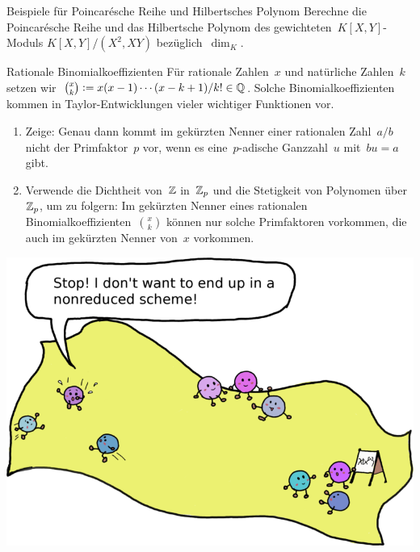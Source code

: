 \documentclass[entwurf]{uebblatt}
\begin{document}

\begin{aufgabe}{3}{Beispiele für Poincarésche Reihe und Hilbertsches Polynom}
Berechne die Poincarésche Reihe und das Hilbertsche Polynom des
gewichteten~$K[X,Y]$-Moduls $K[X,Y]/(X^2, XY)$ bezüglich~$\dim_K$.
\end{aufgabe}

\vfill

\begin{aufgabe}{0}{Rationale Binomialkoeffizienten}
\small
Für rationale Zahlen~$x$ und natürliche Zahlen~$k$ setzen wir~$\binom{x}{k}
\vcentcolon= x (x-1) \cdots (x-k+1) / k! \in \mathbb{Q}$. Solche Binomialkoeffizienten
kommen in Taylor-Entwicklungen vieler wichtiger Funktionen vor.
\begin{enumerate}
\item Zeige: Genau dann kommt im gekürzten Nenner einer rationalen Zahl~$a/b$
nicht der Primfaktor~$p$ vor, wenn es eine~$p$-adische Ganzzahl~$u$ mit~$bu = a$ gibt.
\item Verwende die Dichtheit von~$\mathbb{Z}$ in~$\mathbb{Z}_p$ und die Stetigkeit von
Polynomen über~$\mathbb{Z}_p$, um zu folgern: Im gekürzten Nenner eines rationalen
Binomialkoeffizienten~$\binom{x}{k}$ können nur solche Primfaktoren vorkommen, die auch
im gekürzten Nenner von~$x$ vorkommen.
\end{enumerate}
\end{aufgabe}

\centering
\includegraphics{images/hilbert-scheme-of-points}
\end{document}
